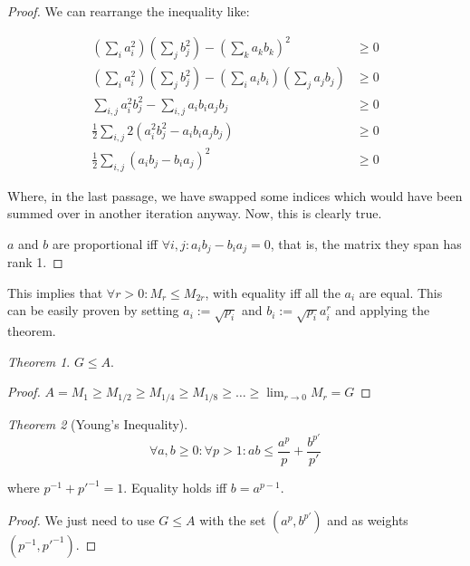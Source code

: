 \documentclass[12pt,a4paper]{report}
\numberwithin{equation}{section}
\theoremstyle{definition}
\theoremstyle{remark}
\newtheorem{theorem}{Theorem}[section]
\begin{document}
\begin{proof}
We can rearrange the inequality like:

\begin{align}
\left(
    \sum_i a_i ^2
\right)
\left(
    \sum_j b_j ^2
\right) -
\left( 
    \sum_k a_k b_k 
\right)^2
&\geq 0\\
\left(
    \sum_i a_i ^2
\right)
\left(
    \sum_j b_j ^2
\right) -
\left( 
    \sum_i a_i b_i 
\right)
\left( 
    \sum_j a_j b_j 
\right)
&\geq 0\\
\sum_{i, j} a_i^2 b_j^2 -\sum_{i, j} a_i b_i a_j b_j &\geq 0
\\
\frac 12 \sum_{i, j} 2\left(
a_i^2 b_j^2 - a_i b_i a_j b_j
\right)&\geq 0
\\
\frac 12 \sum_{i, j} \left(
a_i b_j - b_i a_j
\right)^2 &\geq 0
\end{align}

Where, in the last passage, we have swapped some indices which would have been summed over in another iteration anyway. Now, this is clearly true. 

$a$ and $b$ are proportional iff $\forall i, j : a_i b_j - b_i a_j = 0$, that is, the matrix they span has rank 1.
\end{proof}

This implies that $\forall r>0: M_r \leq M_{2r}$, with equality iff all the $a_i$ are equal. This can be easily proven by setting $a_i := \sqrt{p_i}$ and $b_i := \sqrt{p_i} a_i^r$ and applying the theorem.

\begin{theorem}
$G\leq A$.
\end{theorem}

\begin{proof}
$A = M_1 \geq M_{1/2} \geq M_{1/4} \geq M_{1/8}\geq \dots  \geq \lim_{r\rightarrow 0} M_r = G$
\end{proof}

\begin{theorem}[Young's Inequality]
\begin{equation}
\forall a, b \geq 0: \forall p>1 : ab \leq \frac{a^p}{p} + \frac{b^{p'}}{p'}
\end{equation}

where $p^{-1} + p'^{-1} = 1$. Equality holds iff $b = a^{p-1}$.
\end{theorem}

\begin{proof}
We just need to use $G\leq A$ with the set $(a^p, b^{p'})$ and as weights $(p^{-1}, p'^{-1})$.
\end{proof}
\end{document}
